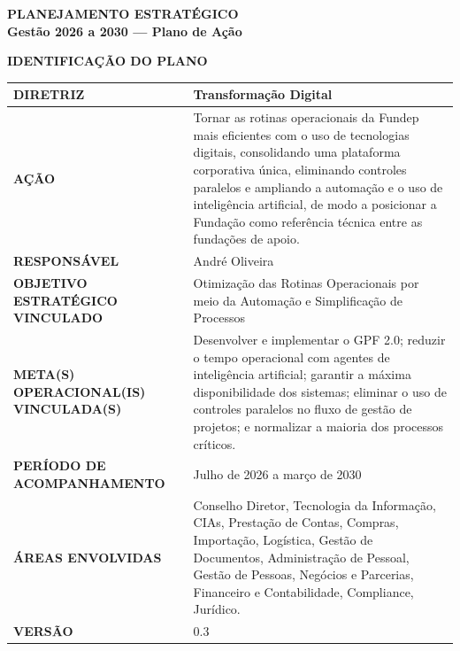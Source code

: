 \documentclass[12pt,a4paper]{article}
\newcommand{\secao}[1]{%
  \par\vspace{6pt}%
  {\noindent\bfseries\color{azulTitulo}\fontsize{13}{16}\selectfont #1}%
  \par\vspace{2pt}%
}
\begin{document}
\newpage

\begin{center}
  {\bfseries\color{azulTitulo}\fontsize{17}{20}\selectfont PLANEJAMENTO ESTRATÉGICO}\\[6pt]
  {\bfseries\color{azulTitulo}\fontsize{13}{16}\selectfont Gestão 2026 a 2030 --- Plano de Ação}
\end{center}

\secao{IDENTIFICAÇÃO DO PLANO}

\begingroup
\small
{}
\renewcommand{\arraystretch}{1.35}
\begin{tabular}{|>{\cellcolor{azulClaro}\bfseries}p{}|p{}|}
\hline
DIRETRIZ & Transformação Digital \\
\hline
AÇÃO & Tornar as rotinas operacionais da Fundep mais eficientes com o uso de tecnologias digitais, consolidando uma plataforma corporativa única, eliminando controles paralelos e ampliando a automação e o uso de inteligência artificial, de modo a posicionar a Fundação como referência técnica entre as fundações de apoio. \\
\hline
RESPONSÁVEL & André Oliveira \\
\hline
OBJETIVO ESTRATÉGICO VINCULADO & Otimização das Rotinas Operacionais por meio da Automação e Simplificação de Processos \\
\hline
META(S) OPERACIONAL(IS) VINCULADA(S) & Desenvolver e implementar o GPF 2.0; reduzir o tempo operacional com agentes de inteligência artificial; garantir a máxima disponibilidade dos sistemas; eliminar o uso de controles paralelos no fluxo de gestão de projetos; e normalizar a maioria dos processos críticos. \\
\hline
PERÍODO DE ACOMPANHAMENTO & Julho de 2026 a março de 2030 \\
\hline
ÁREAS ENVOLVIDAS & Conselho Diretor, Tecnologia da Informação, CIAs, Prestação de Contas, Compras, Importação, Logística, Gestão de Documentos, Administração de Pessoal, Gestão de Pessoas, Negócios e Parcerias, Financeiro e Contabilidade, Compliance, Jurídico. \\
\hline
VERSÃO & 0.3 \\
\hline
\end{tabular}
\endgroup
\end{document}

